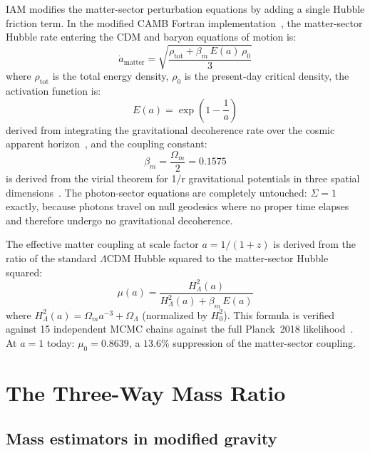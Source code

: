 \documentclass[12pt,a4paper]{article}
\begin{document}
IAM modifies the matter-sector perturbation equations by adding a single Hubble
friction term. In the modified CAMB Fortran implementation~\citep{Mahaffey2026a},
the matter-sector Hubble rate entering the CDM and baryon equations of motion is:
\begin{equation}
\dot{a}_\mathrm{matter} = \sqrt{\frac{\rho_\mathrm{tot} + \beta_m\, E(a)\,\rho_0}{3}}
\end{equation}
where $\rho_\mathrm{tot}$ is the total energy density, $\rho_0$ is the present-day
critical density, the activation function is:
\begin{equation}
E(a) = \exp\!\left(1 - \frac{1}{a}\right)
\end{equation}
derived from integrating the gravitational decoherence rate over the cosmic apparent
horizon~\citep{Jacobson1995,CaiKim2005}, and the coupling constant:
\begin{equation}
\beta_m = \frac{\Omega_m}{2} = 0.1575
\end{equation}
is derived from the virial theorem for 1/r gravitational potentials in three spatial
dimensions~\citep{Mahaffey2026b}. The photon-sector equations are completely
untouched: $\Sigma = 1$ exactly, because photons travel on null geodesics where no
proper time elapses and therefore undergo no gravitational decoherence.

The effective matter coupling at scale factor $a = 1/(1+z)$ is derived from the
ratio of the standard $\Lambda$CDM Hubble squared to the matter-sector Hubble squared:
\begin{equation}
\mu(a) = \frac{H^2_\Lambda(a)}{H^2_\Lambda(a) + \beta_m\, E(a)}
\label{eq:mu}
\end{equation}
where $H^2_\Lambda(a) = \Omega_m a^{-3} + \Omega_\Lambda$ (normalized by $H_0^2$).
This formula is verified against 15 independent MCMC chains against the full
Planck~2018 likelihood~\citep{Mahaffey2026a}. At $a = 1$ today: $\mu_0 = 0.8639$,
a $13.6\%$ suppression of the matter-sector coupling.

\section{The Three-Way Mass Ratio}

\subsection{Mass estimators in modified gravity}
\end{document}
